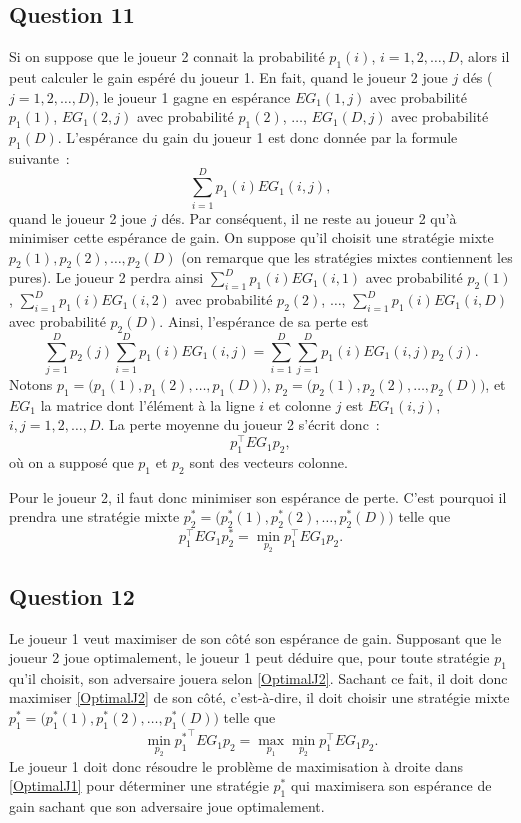 \documentclass[a4paper,11pt]{amsart}
\theoremstyle{plain}
\begin{document}
\subsection{Question 11}

Si on suppose que le joueur 2 connait la probabilité $p_1(i)$, $i = 1, 2, \dotsc, D$, alors il peut calculer le gain espéré du joueur 1. En fait, quand le joueur 2 joue $j$ dés ($j = 1, 2, \dotsc, D$), le joueur 1 gagne en espérance $EG_1(1, j)$ avec probabilité $p_1(1)$, $EG_1(2, j)$ avec probabilité $p_1(2)$, $\dotsc$, $EG_1(D, j)$ avec probabilité $p_1(D)$. L'espérance du gain du joueur 1 est donc donnée par la formule suivante~:
\[\sum_{i=1}^D p_1(i) EG_1(i, j),\]
quand le joueur 2 joue $j$ dés. Par conséquent, il ne reste au joueur 2 qu'à minimiser cette espérance de gain. On suppose qu'il choisit une stratégie mixte $p_2(1), p_2(2), \dotsc, p_2(D)$ (on remarque que les stratégies mixtes contiennent les pures). Le joueur 2 perdra ainsi $\sum_{i=1}^D p_1(i) EG_1(i, 1)$ avec probabilité $p_2(1)$, $\sum_{i=1}^D p_1(i) EG_1(i, 2)$ avec probabilité $p_2(2)$, $\dotsc$, $\sum_{i=1}^D p_1(i) EG_1(i, D)$ avec probabilité $p_2(D)$. Ainsi, l'espérance de sa perte est
\[
\sum_{j=1}^D p_2(j) \sum_{i=1}^D p_1(i) EG_1(i, j) = \sum_{i=1}^D \sum_{j=1}^D p_1(i) EG_1(i, j) p_2(j).
\]
Notons $p_1 = \bigl(p_1(1), p_1(2), \dotsc, p_1(D)\bigr)$, $p_2 = \bigl(p_2(1), p_2(2), \dotsc, p_2(D)\bigr)$, et $EG_1$ la matrice dont l'élément à la ligne $i$ et colonne $j$ est $EG_1(i, j)$, $i, j = 1, 2, \dotsc, D$. La perte moyenne du joueur 2 s'écrit donc~:
\[
p_1^\top EG_1 p_2,
\]
où on a supposé que $p_1$ et $p_2$ sont des vecteurs colonne.

Pour le joueur 2, il faut donc minimiser son espérance de perte. C'est pourquoi il prendra une stratégie mixte $p_2^\ast = \bigl(p_2^\ast(1), p_2^\ast(2), \dotsc, p_2^\ast(D)\bigr)$ telle que
\begin{equation}
\label{OptimalJ2}
p_1^\top EG_1 p_2^\ast = \min_{p_2} p_1^\top EG_1 p_2.
\end{equation}

\subsection{Question 12}

Le joueur 1 veut maximiser de son côté son espérance de gain. Supposant que le joueur 2 joue optimalement, le joueur 1 peut déduire que, pour toute stratégie $p_1$ qu'il choisit, son adversaire jouera selon \eqref{OptimalJ2}. Sachant ce fait, il doit donc maximiser \eqref{OptimalJ2} de son côté, c'est-à-dire, il doit choisir une stratégie mixte $p_1^\ast = \bigl(p_1^\ast(1), p_1^\ast(2), \dotsc, p_1^\ast(D)\bigr)$ telle que
\begin{equation}
\label{OptimalJ1}
\min_{p_2} {p_1^\ast}^\top EG_1 p_2 = \max_{p_1} \min_{p_2} p_1^\top EG_1 p_2.
\end{equation}
Le joueur 1 doit donc résoudre le problème de maximisation à droite dans \eqref{OptimalJ1} pour déterminer une stratégie $p_1^\ast$ qui maximisera son espérance de gain sachant que son adversaire joue optimalement.
\end{document}
